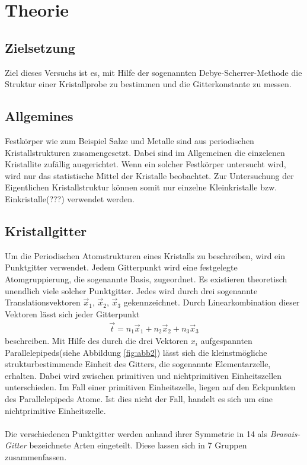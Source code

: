 \section{Theorie}
\label{sec:Theorie}

\subsection{Zielsetzung}
\label{subsec:Zielsetzung}
Ziel dieses Versuchs ist es, mit Hilfe der sogenannten
Debye-Scherrer-Methode die Struktur einer Kristallprobe
zu bestimmen und die Gitterkonstante zu messen.

\subsection{Allgemines}
\label{subsec:allgemein}

Festkörper wie zum Beispiel Salze und Metalle
sind aus periodischen
Kristallstrukturen zusamengesetzt. Dabei sind im
Allgemeinen die einzelenen Kristallite zufällig
ausgerichtet. Wenn ein solcher Festkörper untersucht wird,
wird nur das statistische Mittel der Kristalle beobachtet.
Zur Untersuchung der Eigentlichen Kristallstruktur
können somit nur einzelne Kleinkristalle bzw.
Einkristalle(???) verwendet werden.


\subsection{Kristallgitter}
\label{subsec:kristallstrukturen}
Um die Periodischen Atomstrukturen eines Kristalls
zu beschreiben, wird ein Punktgitter verwendet.
Jedem Gitterpunkt wird eine festgelegte Atomgruppierung,
die sogenannte Basis, zugeordnet.
Es existieren theoretisch unendlich viele solcher Punktgitter.
Jedes wird durch drei sogenannte Translationsvektoren
$\vec{x}_{1}$, $\vec{x}_{2}$, $\vec{x}_{3}$ gekennzeichnet.
Durch Linearkombination dieser Vektoren lässt sich
jeder Gitterpunkt
\begin{align}
  \label{eqn:1*}
  \vec{t} = n_{1} \vec{x}_{1} + n_{2} \vec{x}_{2} + n_{3} \vec{x}_{3}
\end{align}
beschreiben.
Mit Hilfe des durch die drei Vektoren $x_{i}$ aufgespannten
Parallelepipeds(siehe Abbildung \ref{fig:abb2}) lässt sich die
kleinstmögliche strukturbestimmende Einheit des Gitters,
die sogenannte Elementarzelle, erhalten.
Dabei wird zwischen primitiven und nichtprimitiven Einheitszellen
unterschieden. Im Fall einer primitiven Einheitszelle,
liegen auf den Eckpunkten des Parallelepipeds Atome.
Ist dies nicht der Fall, handelt es sich um eine
nichtprimitive Einheitszelle.\\ \\
Die verschiedenen Punktgitter werden anhand ihrer Symmetrie
in 14 als \textit{Bravais-Gitter} bezeichnete Arten eingeteilt.
Diese lassen sich in 7 Gruppen zusammenfassen.
